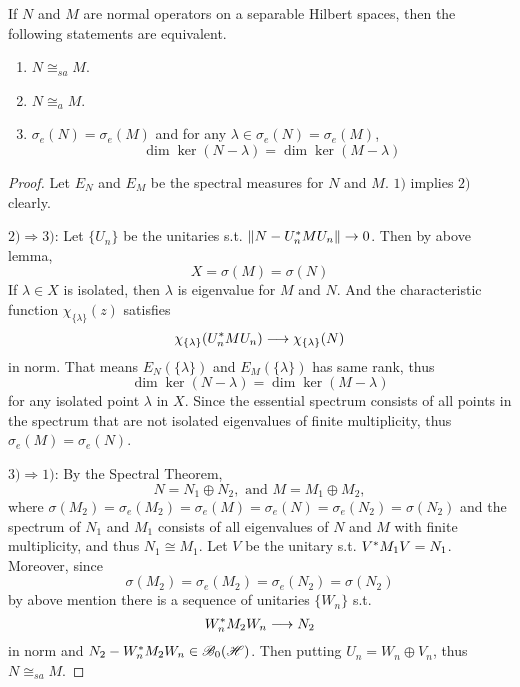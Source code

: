 \documentclass[a4paper,11pt]{report}
\begin{document}
\begin{thm}
	If $N$ and $M$ are normal operators on a separable Hilbert spaces, then the following statements are equivalent.
	\begin{enumerate}[label = \arabic*)]
		\item $N \cong_{sa} M$.
		\item $N \cong_a M$.
		\item $\sigma_e(N) = \sigma_e(M)$ and for any $\lambda \in \sigma_e(N) = \sigma_e(M)$,
		\begin{equation*}
			\dim{\ker{(N-\lambda)}} = \dim{\ker{(M-\lambda)}}
		\end{equation*}
	\end{enumerate}
\end{thm}
\begin{proof}
	Let $E_N$ and $E_M$ be the spectral measures for $N$ and $M$. $1)$ implies $2)$ clearly.
	\item $2) \Rightarrow 3)$: Let $\{U_n\}$ be the unitaries s.t. $\left\lVert N - U_n^{*}MU_n\right\lVert \rightarrow 0$. Then by above lemma, 
	\begin{equation*}
		X = \sigma(M) = \sigma(N)
	\end{equation*}
	If $\lambda \in X$ is isolated, then $\lambda$ is eigenvalue for $M$ and $N$. And the characteristic function $\chi_{\{\lambda\}}(z)$ satisfies
	\begin{equation*}
		\chi_{\{\lambda\}}(U^{*}_nMU_n) \longrightarrow \chi_{\{\lambda\}}(N)
	\end{equation*}
	in norm. That means $E_N(\{\lambda\})$ and $E_M(\{\lambda\})$ has same rank, thus 
	\begin{equation*}
		\dim{\ker{(N-\lambda)}} = \dim{\ker{(M-\lambda)}}
	\end{equation*}
	for any isolated point $\lambda$ in $X$. Since the essential spectrum consists of all points in the spectrum that are not isolated eigenvalues of finite multiplicity, thus $\sigma_e(M) = \sigma_e(N)$.
	\item $3) \Rightarrow 1)$: By the Spectral Theorem, 
	\begin{equation*}
		N = N_1 \oplus N_2, \text{ and } M = M_1 \oplus M_2,
	\end{equation*}
	where $\sigma(M_2) = \sigma_e(M_2) = \sigma_e(M) = \sigma_e(N) = \sigma_e(N_2) = \sigma(N_2)$ and the spectrum of $N_1$ and $M_1$ consists of all eigenvalues of $N$ and $M$ with finite multiplicity, and thus $N_1 \cong M_1$. Let $V$ be the unitary s.t. $V^{*}M_1V = N_1$. Moreover, since
	\begin{equation*}
		\sigma(M_2) = \sigma_e(M_2) = \sigma_e(N_2) = \sigma(N_2)
	\end{equation*}
	by above mention there is a sequence of unitaries $\{W_n\}$ s.t.
	\begin{equation*}
		W^{*}_n M_2 W_n \longrightarrow N_2
 	\end{equation*}
 	in norm and $N_2 - W^{*}_n M_2 W_n \in \mathscr{B}_{0}\mathscr{(H)}$. Then putting $U_n = W_n \oplus V_n$, thus $N \cong_{sa} M$. 
\end{proof}
\end{document}
